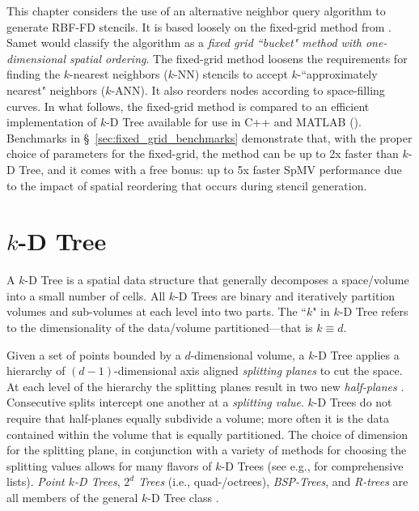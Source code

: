 \documentclass{report}
\begin{document}
This chapter considers the use of an alternative neighbor query algorithm to generate RBF-FD stencils. It is based loosely on the fixed-grid method from \cite{Krog2010,Green2010,Johnson2011}. Samet\cite{Samet2005} would classify the algorithm as a \emph{fixed grid ``bucket" method with one-dimensional spatial ordering}. The fixed-grid method loosens the requirements for finding the $k$-nearest neighbors ($k$-NN) stencils to accept $k$-``approximately nearest" neighbors ($k$-ANN). It also reorders nodes according to space-filling curves. In what follows, the fixed-grid method is compared to an efficient implementation of $k$-D Tree available for use in C++ and MATLAB (\cite{TagliasacchiMFE}). Benchmarks in \S~\ref{sec:fixed_grid_benchmarks} demonstrate that, with the proper choice of parameters for the fixed-grid, the method can be up to 2x faster than $k$-D Tree, and it comes with a free bonus: up to 5x faster SpMV performance due to the impact of spatial reordering that occurs during stencil generation. 


\section{\texorpdfstring{$k$-D}{k-D} Tree}

A $k$-D Tree is a spatial data structure that generally decomposes a space/volume into a small number of cells. All $k$-D Trees are binary and iteratively partition volumes and sub-volumes at each level into two parts. The ``$k$" in $k$-D Tree refers to the dimensionality of the data/volume  partitioned---that is $k \equiv d$. 


Given a set of points bounded by a $d$-dimensional volume, a $k$-D Tree applies a hierarchy of $(d-1)$-dimensional axis aligned \emph{splitting planes} to cut the space. At each level of the hierarchy the splitting planes result in two new \emph{half-planes} \cite{Skiena2008}. Consecutive splits intercept one another at a \emph{splitting value}. $k$-D Trees do not require that half-planes equally subdivide a volume; more often it is the data contained within the volume that is equally partitioned. The choice of dimension for the splitting plane, in conjunction with a variety of methods for choosing the splitting values allows for many flavors of $k$-D Trees (see e.g., \cite{Samet2005, Skiena2008, Berg2008} for comprehensive lists). \emph{Point $k$-D Trees}, \emph{$2^d$ Trees} (i.e., quad-/octrees), \emph{BSP-Trees}, and \emph{R-trees} are all members of the general $k$-D Tree class \cite{Skiena2008,Ying2006}.
\end{document}
